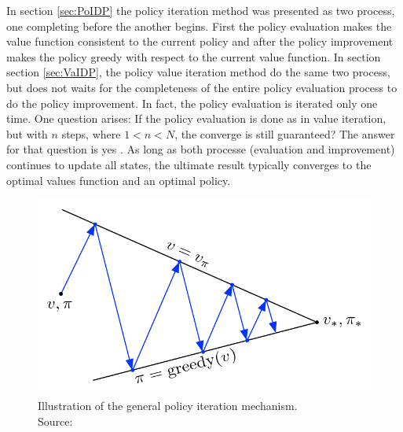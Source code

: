 In section \eqref{sec:PoIDP} the policy iteration method was presented as two process, one completing before the another begins. First the policy evaluation makes the value function consistent to the current policy and after the policy improvement makes the policy greedy with respect to the current value function. In section section \eqref{sec:VaIDP}, the policy value iteration method do the same two process, but does not waits for the completeness of the entire policy evaluation process to do the policy improvement. In fact, the policy evaluation is iterated only one time. One question arises: If the policy evaluation is done as in value iteration, but with $n$ steps, where  $1<n<N$, the converge is still guaranteed? The answer for that question is yes
. 
As long as both processe (evaluation and improvement) continues to update all states, the ultimate result typically converges to the optimal values function and an optimal policy. 

\begin{figure}[h]
    \centering
    \includegraphics[scale=0.5]{GPI1.png}
    \caption{Illustration of the general policy iteration mechanism.\\Source: \citep{sutton2018}}
    \label{fig:GPI1}
  \end{figure} 

